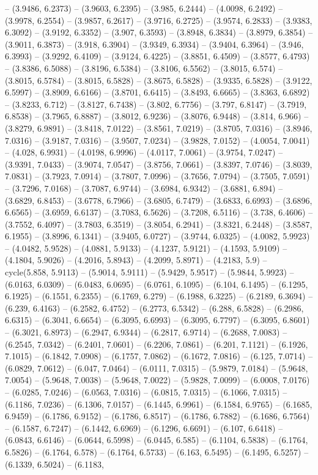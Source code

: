 -- (3.9486, 6.2373) -- (3.9603, 6.2395) -- (3.985, 6.2444) -- (4.0098, 6.2492) -- (3.9978, 6.2554) -- (3.9857, 6.2617) -- (3.9716, 6.2725) -- (3.9574, 6.2833) -- (3.9383, 6.3092) -- (3.9192, 6.3352) -- (3.907, 6.3593) -- (3.8948, 6.3834) -- (3.8979, 6.3854) -- (3.9011, 6.3873) -- (3.918, 6.3904) -- (3.9349, 6.3934) -- (3.9404, 6.3964) -- (3.946, 6.3993) -- (3.9292, 6.4109) -- (3.9124, 6.4225) -- (3.8851, 6.4509) -- (3.8577, 6.4793) -- (3.8386, 6.5088) -- (3.8196, 6.5384) -- (3.8106, 6.5562) -- (3.8015, 6.574) -- (3.8015, 6.5784) -- (3.8015, 6.5828) -- (3.8675, 6.5828) -- (3.9335, 6.5828) -- (3.9122, 6.5997) -- (3.8909, 6.6166) -- (3.8701, 6.6415) -- (3.8493, 6.6665) -- (3.8363, 6.6892) -- (3.8233, 6.712) -- (3.8127, 6.7438) -- (3.802, 6.7756) -- (3.797, 6.8147) -- (3.7919, 6.8538) -- (3.7965, 6.8887) -- (3.8012, 6.9236) -- (3.8076, 6.9448) -- (3.814, 6.966) -- (3.8279, 6.9891) -- (3.8418, 7.0122) -- (3.8561, 7.0219) -- (3.8705, 7.0316) -- (3.8946, 7.0316) -- (3.9187, 7.0316) -- (3.9507, 7.0234) -- (3.9828, 7.0152) -- (4.0054, 7.0041) -- (4.028, 6.9931) -- (4.0198, 6.9996) -- (4.0117, 7.0061) -- (3.9754, 7.0247) -- (3.9391, 7.0433) -- (3.9074, 7.0547) -- (3.8756, 7.0661) -- (3.8397, 7.0746) -- (3.8039, 7.0831) -- (3.7923, 7.0914) -- (3.7807, 7.0996) -- (3.7656, 7.0794) -- (3.7505, 7.0591) -- (3.7296, 7.0168) -- (3.7087, 6.9744) -- (3.6984, 6.9342) -- (3.6881, 6.894) -- (3.6829, 6.8453) -- (3.6778, 6.7966) -- (3.6805, 6.7479) -- (3.6833, 6.6993) -- (3.6896, 6.6565) -- (3.6959, 6.6137) -- (3.7083, 6.5626) -- (3.7208, 6.5116) -- (3.738, 6.4606) -- (3.7552, 6.4097) -- (3.7803, 6.3519) -- (3.8054, 6.2941) -- (3.8321, 6.2448) -- (3.8587, 6.1955) -- (3.8996, 6.1341) -- (3.9405, 6.0727) -- (3.9744, 6.0325) -- (4.0082, 5.9923) -- (4.0482, 5.9528) -- (4.0881, 5.9133) -- (4.1237, 5.9121) -- (4.1593, 5.9109) -- (4.1804, 5.9026) -- (4.2016, 5.8943) -- (4.2099, 5.8971) -- (4.2183, 5.9) -- cycle(5.858, 5.9113) -- (5.9014, 5.9111) -- (5.9429, 5.9517) -- (5.9844, 5.9923) -- (6.0163, 6.0309) -- (6.0483, 6.0695) -- (6.0761, 6.1095) -- (6.104, 6.1495) -- (6.1295, 6.1925) -- (6.1551, 6.2355) -- (6.1769, 6.279) -- (6.1988, 6.3225) -- (6.2189, 6.3694) -- (6.239, 6.4163) -- (6.2582, 6.4752) -- (6.2773, 6.5342) -- (6.288, 6.5828) -- (6.2986, 6.6315) -- (6.3041, 6.6654) -- (6.3095, 6.6993) -- (6.3095, 6.7797) -- (6.3095, 6.8601) -- (6.3021, 6.8973) -- (6.2947, 6.9344) -- (6.2817, 6.9714) -- (6.2688, 7.0083) -- (6.2545, 7.0342) -- (6.2401, 7.0601) -- (6.2206, 7.0861) -- (6.201, 7.1121) -- (6.1926, 7.1015) -- (6.1842, 7.0908) -- (6.1757, 7.0862) -- (6.1672, 7.0816) -- (6.125, 7.0714) -- (6.0829, 7.0612) -- (6.047, 7.0464) -- (6.0111, 7.0315) -- (5.9879, 7.0184) -- (5.9648, 7.0054) -- (5.9648, 7.0038) -- (5.9648, 7.0022) -- (5.9828, 7.0099) -- (6.0008, 7.0176) -- (6.0285, 7.0246) -- (6.0563, 7.0316) -- (6.0815, 7.0315) -- (6.1066, 7.0315) -- (6.1186, 7.0236) -- (6.1306, 7.0157) -- (6.1445, 6.9961) -- (6.1584, 6.9765) -- (6.1685, 6.9459) -- (6.1786, 6.9152) -- (6.1786, 6.8517) -- (6.1786, 6.7882) -- (6.1686, 6.7564) -- (6.1587, 6.7247) -- (6.1442, 6.6969) -- (6.1296, 6.6691) -- (6.107, 6.6418) -- (6.0843, 6.6146) -- (6.0644, 6.5998) -- (6.0445, 6.585) -- (6.1104, 6.5838) -- (6.1764, 6.5826) -- (6.1764, 6.578) -- (6.1764, 6.5733) -- (6.163, 6.5495) -- (6.1495, 6.5257) -- (6.1339, 6.5024) -- (6.1183, 
